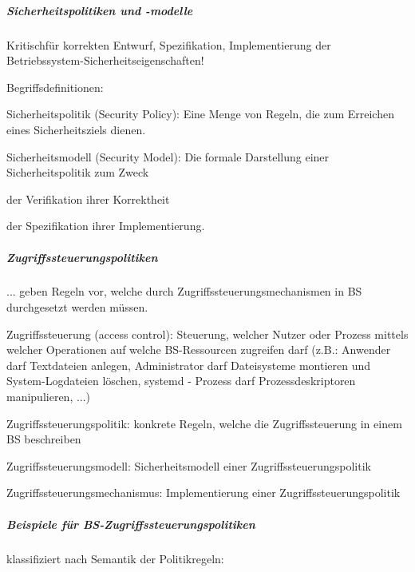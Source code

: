 \documentclass[a4paper]{article}
\begin{document}
\begin{multicols}{3}
    \subparagraph{Sicherheitspolitiken und
        -modelle}

    Kritischfür korrekten Entwurf, Spezifikation, Implementierung der
    Betriebssystem-Sicherheitseigenschaften!

    Begriffsdefinitionen:

    \begin{itemize*}
        \item
        Sicherheitspolitik (Security Policy): Eine Menge von Regeln, die zum
        Erreichen eines Sicherheitsziels dienen.
        \item
        Sicherheitsmodell (Security Model): Die formale Darstellung einer
        Sicherheitspolitik zum Zweck
        \begin{itemize*}
            \item der Verifikation ihrer Korrektheit
            \item der Spezifikation ihrer Implementierung.
        \end{itemize*}
    \end{itemize*}


    \subparagraph{Zugriffssteuerungspolitiken}

    ... geben Regeln vor, welche durch Zugriffssteuerungsmechanismen in BS
    durchgesetzt werden müssen.

    Zugriffssteuerung (access control): Steuerung, welcher Nutzer oder
    Prozess mittels welcher Operationen auf welche BS-Ressourcen zugreifen
    darf (z.B.: Anwender darf Textdateien anlegen, Administrator darf
    Dateisysteme montieren und System-Logdateien löschen, systemd - Prozess
    darf Prozessdeskriptoren manipulieren, ...)

    Zugriffssteuerungspolitik: konkrete Regeln, welche die Zugriffssteuerung
    in einem BS beschreiben

    Zugriffssteuerungsmodell: Sicherheitsmodell einer
    Zugriffssteuerungspolitik

    Zugriffssteuerungsmechanismus: Implementierung einer
    Zugriffssteuerungspolitik


    \subparagraph{Beispiele für
        BS-Zugriffssteuerungspolitiken}

    klassifiziert nach Semantik der Politikregeln:


\end{multicols}
\end{document}
